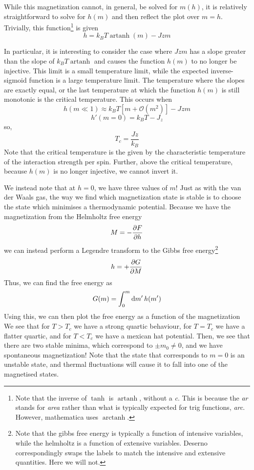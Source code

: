 While this magnetization cannot, in general, be solved for \(m(h)\), it is relatively straightforward to solve for \(h(m)\) and then reflect the plot over \(m=h\). Trivially, this function\footnote{Note that the inverse of \(\tanh\) is \(\operatorname{artanh}\), without a \emph{c}. This is because the \emph{ar} stands for \emph{area} rather than what is typically expected for trig functions, \emph{arc}. However, mathematica uses \(\operatorname{arctanh}\).} is given
\begin{equation}
	h = k_BT \operatorname{artanh}(m) - Jzm
\end{equation}

\diagram{}

In particular, it is interesting to consider the case where \(Jzm\) has a slope greater than the slope of \(k_BT \operatorname{artanh}\) and causes the function \(h(m)\) to no longer be injective. This limit is a small temperature limit, while the expected inverse-sigmoid function is a large temperature limit. The temperature where the slopes are exactly equal, or the last temperature at which the function \(h(m)\) is still monotonic is the critical temperature. This occurs when 
\[h(m\ll1)\approx k_BT[m+\mathscr{O}(m^2)]-Jzm\]
\[h'(m=0) = k_BT-J_z\]
so,
\begin{equation}
	T_c = \frac{Jz}{k_B}
\end{equation}
Note that the critical temperature is the given by the characteristic temperature of the interaction strength per spin. Further, above the critical temperature, because \(h(m)\) is no longer injective, we cannot invert it.

We instead note that at \(h=0\), we have three values of \(m\)! Just as with the van der Waals gas, the way we find which magnetization state is stable is to choose the state which minimises a thermodynamic potential. Because we have the magnetization from the Helmholtz free energy
\[M = -\frac{\partial F}{\partial h}\]
we can instead perform a Legendre transform to the Gibbs free energy\footnote{Note that the gibbs free energy is typically a function of intensive variables, while the helmholtz is a function of extensive variables. Deserno correspondingly swaps the labels to match the intensive and extensive quantities. Here we will not.}
\[h = +\frac{\partial G}{\partial M}\]
Thus, we can find the free energy as
\[G(m) = \int_0^m\d{m'}h(m')\]
Using this, we can then plot the free energy as a function of the magnetization
\diagram{}
We see that for \(T>T_c\) we have a strong quartic behaviour, for \(T=T_c\) we have a flatter quartic, and for \(T<T_c\) we have a mexican hat potential. Then, we see that there are two stable minima, which correspond to \(\pm m_0 \neq 0\), and we have spontaneous magnetization! Note that the state that corresponds to \(m=0\) is an unstable state, and thermal fluctuations will cause it to fall into one of the magnetised states. 

